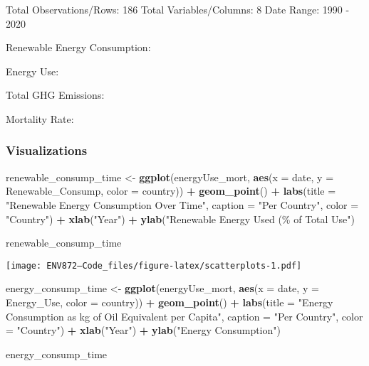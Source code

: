 \documentclass[
]{article}
\newenvironment{Shaded}{\begin{snugshade}}{\end{snugshade}}
\newcommand{\AttributeTok}[1]{\textcolor[rgb]{0.13,0.29,0.53}{#1}}
\newcommand{\FunctionTok}[1]{\textcolor[rgb]{0.13,0.29,0.53}{\textbf{#1}}}
\newcommand{\NormalTok}[1]{#1}
\newcommand{\OtherTok}[1]{\textcolor[rgb]{0.56,0.35,0.01}{#1}}
\newcommand{\SpecialCharTok}[1]{\textcolor[rgb]{0.81,0.36,0.00}{\textbf{#1}}}
\newcommand{\StringTok}[1]{\textcolor[rgb]{0.31,0.60,0.02}{#1}}
\begin{document}
Total Observations/Rows: 186 Total Variables/Columns: 8 Date Range: 1990
- 2020

Renewable Energy Consumption:

Energy Use:

Total GHG Emissions:

Mortality Rate:

\hypertarget{visualizations}{%
\subsubsection{Visualizations}\label{visualizations}}

\begin{Shaded}
\begin{Highlighting}[]
\NormalTok{renewable\_consump\_time }\OtherTok{\textless{}{-}} \FunctionTok{ggplot}\NormalTok{(energyUse\_mort,}
    \FunctionTok{aes}\NormalTok{(}\AttributeTok{x =}\NormalTok{ date, }\AttributeTok{y =}\NormalTok{ Renewable\_Consump, }\AttributeTok{color =}\NormalTok{ country)) }\SpecialCharTok{+}
    \FunctionTok{geom\_point}\NormalTok{() }\SpecialCharTok{+} \FunctionTok{labs}\NormalTok{(}\AttributeTok{title =} \StringTok{"Renewable Energy Consumption Over Time"}\NormalTok{,}
    \AttributeTok{caption =} \StringTok{"Per Country"}\NormalTok{, }\AttributeTok{color =} \StringTok{"Country"}\NormalTok{) }\SpecialCharTok{+}
    \FunctionTok{xlab}\NormalTok{(}\StringTok{"Year"}\NormalTok{) }\SpecialCharTok{+} \FunctionTok{ylab}\NormalTok{(}\StringTok{"Renewable Energy Used (\% of Total Use"}\NormalTok{)}

\NormalTok{renewable\_consump\_time}
\end{Highlighting}
\end{Shaded}

\texttt{[image: ENV872---Code\_files/figure-latex/scatterplots-1.pdf]}

\begin{Shaded}
\begin{Highlighting}[]
\NormalTok{energy\_consump\_time }\OtherTok{\textless{}{-}} \FunctionTok{ggplot}\NormalTok{(energyUse\_mort,}
    \FunctionTok{aes}\NormalTok{(}\AttributeTok{x =}\NormalTok{ date, }\AttributeTok{y =}\NormalTok{ Energy\_Use, }\AttributeTok{color =}\NormalTok{ country)) }\SpecialCharTok{+}
    \FunctionTok{geom\_point}\NormalTok{() }\SpecialCharTok{+} \FunctionTok{labs}\NormalTok{(}\AttributeTok{title =} \StringTok{"Energy Consumption as kg of Oil Equivalent per Capita"}\NormalTok{,}
    \AttributeTok{caption =} \StringTok{"Per Country"}\NormalTok{, }\AttributeTok{color =} \StringTok{"Country"}\NormalTok{) }\SpecialCharTok{+}
    \FunctionTok{xlab}\NormalTok{(}\StringTok{"Year"}\NormalTok{) }\SpecialCharTok{+} \FunctionTok{ylab}\NormalTok{(}\StringTok{"Energy Consumption"}\NormalTok{)}

\NormalTok{energy\_consump\_time}
\end{Highlighting}
\end{Shaded}
\end{document}
